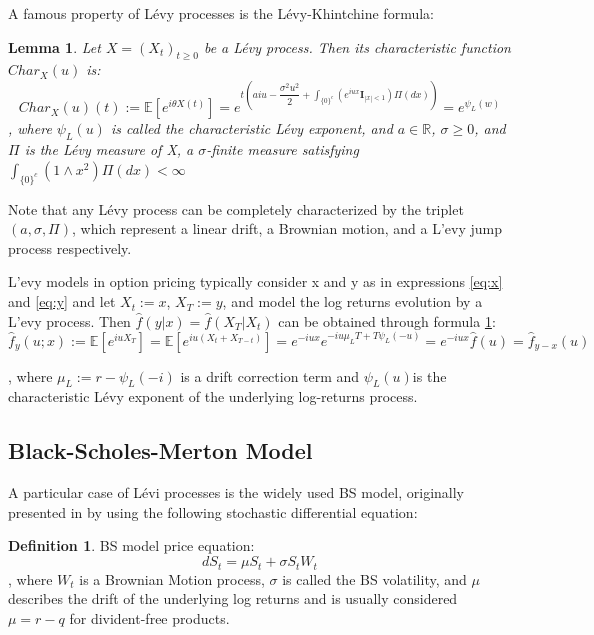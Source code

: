 \documentclass[12,twoside]{mammeTFM}
\newtheorem{lem}[thm]{Lemma}
\theoremstyle{definition}
\newtheorem{definition}[thm]{Definition}
\theoremstyle{remark}
\newcommand{\E}{\ensuremath{\mathbb{E}}}
\newcommand{\R}{\ensuremath{\mathbb{R}}}
\begin{document}
A famous property of L\'evy processes is the L\'evy-Khintchine formula:
\begin{lem}\label{levy_khin} Let $X = (X_t)_{t\geq 0}$ be a L\'evy process. Then its characteristic function $Char_X(u)$ is:
$$
Char_X(u)(t) := \E \left[e^{i\theta X(t)}\right] = e^{t\left(aiu - \dfrac{\sigma^2 u^2}{2} + \int_{\{0\}^c}(e^{iu x} \textbf{I}_{|x| < 1})\Pi(dx)\right)} = e^{\psi_L(w)}
$$
, where $\psi_L(u)$ is called the characteristic L\'evy exponent, and $a \in \R$, $\sigma \geq 0$, and $\Pi$ is the L\'evy measure of X, a $\sigma$-finite measure satisfying $\int_{\{0\} ^c}(1 \wedge x^2)\Pi (dx) < \infty$
\end{lem}

Note that any L\'evy process can be completely characterized by the triplet $(a, \sigma, \Pi)$, which represent a linear drift, a Brownian motion, and a L'evy jump process respectively.

L'evy models in option pricing typically consider x and y as in expressions \ref{eq:x} and \ref{eq:y} and let $X_t := x$, $X_T := y$, and model the log returns evolution by a L'evy process. Then $\hat{f}(y|x) = \hat{f}(X_T|X_t)$ can be obtained through formula \ref{levy_khin}:
\begin{equation}\label{eq:levy_char}
\hat{f}_{y}(u; x) := 
\E\left[e^{iu X_T}\right] = 
\E\left[e^{iu (X_t + X_{T-t})}\right] = 
e^{-iu x}e^{-i u \mu_L T + T \psi_L(-u)} = 
e^{-iu x}\hat{f}(u) = 
\hat{f}_{y - x}(u)
\end{equation}

, where $\mu_L:= r - \psi_L(-i)$ is a drift correction term and $\psi_L(u)$is the characteristic L\'evy exponent of the underlying log-returns process.

\subsection{Black-Scholes-Merton Model} \label{subsec:bs}

A particular case of L\'evi processes is the widely used BS model, originally presented in \cite{bs73} by using the following stochastic differential equation:
\begin{definition} BS model price equation:
\begin{equation}
dS_t = \mu S_t + \sigma S_t W_t
\end{equation}
, where $W_t$ is a Brownian Motion process, $\sigma$ is called the BS volatility, and $\mu$ describes the drift of the underlying log returns and is usually considered $\mu = r - q$ for divident-free products.
\end{definition}
\end{document}
